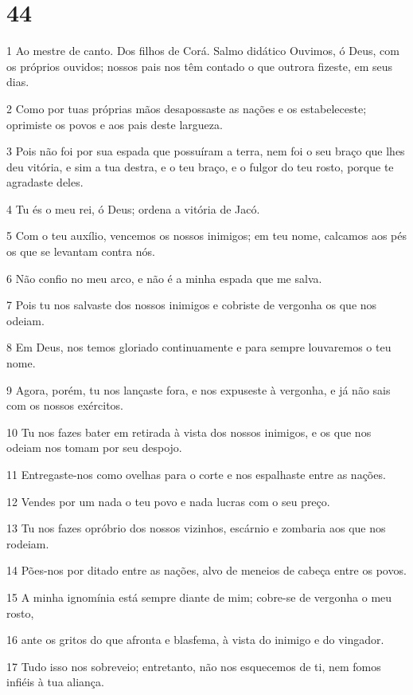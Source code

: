 \chapter{44}

\par 1 Ao mestre de canto. Dos filhos de Corá. Salmo didático Ouvimos, ó Deus, com os próprios ouvidos; nossos pais nos têm contado o que outrora fizeste, em seus dias.
\par 2 Como por tuas próprias mãos desapossaste as nações e os estabeleceste; oprimiste os povos e aos pais deste largueza.
\par 3 Pois não foi por sua espada que possuíram a terra, nem foi o seu braço que lhes deu vitória, e sim a tua destra, e o teu braço, e o fulgor do teu rosto, porque te agradaste deles.
\par 4 Tu és o meu rei, ó Deus; ordena a vitória de Jacó.
\par 5 Com o teu auxílio, vencemos os nossos inimigos; em teu nome, calcamos aos pés os que se levantam contra nós.
\par 6 Não confio no meu arco, e não é a minha espada que me salva.
\par 7 Pois tu nos salvaste dos nossos inimigos e cobriste de vergonha os que nos odeiam.
\par 8 Em Deus, nos temos gloriado continuamente e para sempre louvaremos o teu nome.
\par 9 Agora, porém, tu nos lançaste fora, e nos expuseste à vergonha, e já não sais com os nossos exércitos.
\par 10 Tu nos fazes bater em retirada à vista dos nossos inimigos, e os que nos odeiam nos tomam por seu despojo.
\par 11 Entregaste-nos como ovelhas para o corte e nos espalhaste entre as nações.
\par 12 Vendes por um nada o teu povo e nada lucras com o seu preço.
\par 13 Tu nos fazes opróbrio dos nossos vizinhos, escárnio e zombaria aos que nos rodeiam.
\par 14 Pões-nos por ditado entre as nações, alvo de meneios de cabeça entre os povos.
\par 15 A minha ignomínia está sempre diante de mim; cobre-se de vergonha o meu rosto,
\par 16 ante os gritos do que afronta e blasfema, à vista do inimigo e do vingador.
\par 17 Tudo isso nos sobreveio; entretanto, não nos esquecemos de ti, nem fomos infiéis à tua aliança.
